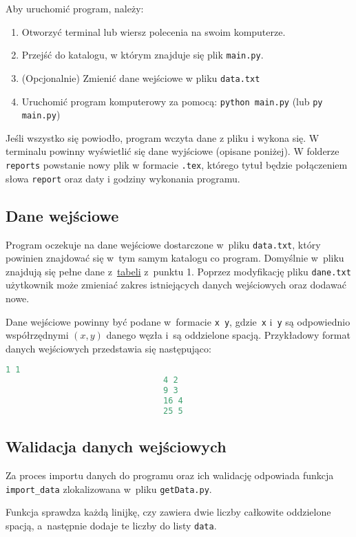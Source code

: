 \documentclass[12pt]{article}
\begin{document}
Aby uruchomić program, należy:
\begin{enumerate}
    \item Otworzyć terminal lub wiersz polecenia na swoim komputerze.
    \item Przejść do katalogu, w którym znajduje się plik \texttt{main.py}.
    \item (Opcjonalnie) Zmienić dane wejściowe w pliku \texttt{data.txt}
    \item Uruchomić program komputerowy za pomocą: \texttt{python main.py} (lub \texttt{py main.py})
\end{enumerate}
Jeśli wszystko się powiodło, program wczyta dane z pliku i wykona się. W terminalu powinny wyświetlić się dane wyjściowe (opisane poniżej). W folderze \texttt{reports} powstanie nowy plik w formacie \texttt{.tex}, którego tytuł będzie połączeniem słowa \texttt{report} oraz daty i godziny wykonania programu.
\subsection{Dane wejściowe}
Program oczekuje na dane wejściowe dostarczone w~pliku \texttt{data.txt}, który powinien znajdować się w~tym samym katalogu co program. Domyślnie w~pliku znajdują się pełne dane z~\hyperlink{tabela}{tabeli} z~punktu 1. Poprzez modyfikację pliku \texttt{dane.txt} użytkownik może zmieniać zakres istniejących danych wejściowych oraz dodawać nowe. 

Dane wejściowe powinny być podane w~formacie \texttt{x y}, gdzie~\texttt{x} i~\texttt{y} są odpowiednio współrzędnymi $(x,y)$ danego węzła i~są oddzielone spacją. Przykładowy format danych wejściowych przedstawia się następująco: 
\begin{lstlisting}[language = Python]
                                1 1
                                4 2
                                9 3
                                16 4
                                25 5
\end{lstlisting}
\subsection{Walidacja danych wejściowych}
Za proces importu danych do programu oraz ich walidację odpowiada funkcja \texttt{import\_data} zlokalizowana w~pliku \texttt{getData.py}.

Funkcja sprawdza każdą linijkę, czy zawiera dwie liczby całkowite oddzielone spacją, a~następnie dodaje te liczby do listy \texttt{data}. 
\end{document}
